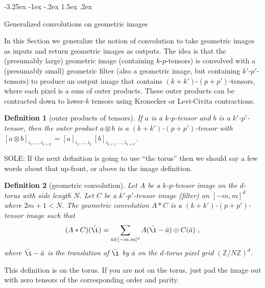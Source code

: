 \documentclass{article}
\makeatletter
\theoremstyle{plain}
\newtheorem{definition}{Definition}
\newcommand{\sectionname}{Section}
\renewcommand\section{\@startsection {section}{1}{\z@}%
  {-3.25ex \@plus -1ex \@minus -.2ex}%
  {1.5ex \@plus .2ex}%
  {\raggedright\normalfont\large\bfseries}}%
\makeatother
\begin{document}
\section{Generalized convolutions on geometric images}\label{sec:convolution}

In this \sectionname{} we generalize the notion of convolution to take geometric images as inputs and return geometric images as outputs.
The idea is that the (presumably large) geometric image (containing $k$-$p$-tensors) is convolved with a (presumably small) geometric filter (also a geometric image, but containing $k'$-$p'$-tensors) to produce an output image that contains $(k+k')$-$(p+p')$-tensors, where each pixel is a sum of outer products.
These outer products can be contracted down to lower-$k$ tensors using Kronecker or Levi-Civita contractions.

\begin{definition}[outer products of tensors]
If $a$ is a $k$-$p$-tensor and $b$ is a $k'$-$p'$-tensor, then the outer product $a\otimes b$ is a $(k+k')$-$(p+p')$-tensor with $[a\otimes b]_{i_1,\ldots,i_{k+k'}} = [a]_{i_1,\ldots,i_k}\,[b]_{i_{k+1},\ldots,i_{k+k'}}$.
\end{definition}

SOLE: If the next definition is going to use ``the torus'' then we should say a few words about that up-front, or above in the image definition.

\begin{definition}[geometric convolution]
Let $A$ be a $k$-$p$-tensor image on the $d$-torus with side length $N$.
Let $C$ be a $k'$-$p'$-tensor image (filter) on $[-m, m]^d$ where $2m+1<N$.
The geometric convolution $A\ast C$ is a $(k+k')$-$(p+p')$-tensor image such that
\begin{equation}
    (A\ast C)(\bar\i) = \sum_{\bar a\in[-m, m]^d} A(\bar\i - \bar a)\otimes C(\bar a) ~,
\end{equation}
where $\bar\i - \bar a$ is the translation of $\bar\i$ by $\bar a$ on the $d$-torus pixel grid $(\mathbb Z / N\mathbb Z)^d$.
\end{definition}
This definition is on the torus. If you are not on the torus, just pad the image out with zero tensors of the corresponding order and parity. 
\end{document}
